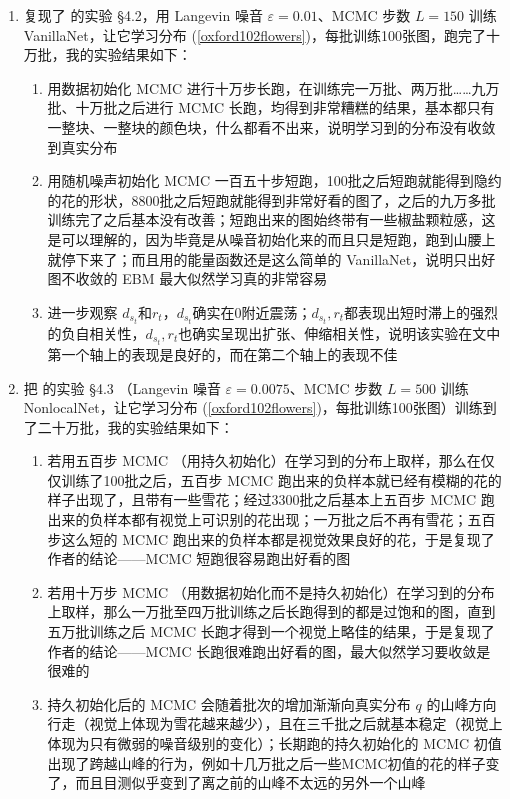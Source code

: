 \documentclass[11pt]{article}
\begin{document}
\begin{enumerate}
\begin{enumerate}
\end{enumerate}
\item 复现了 \cite{nijkamp2019anatomy} 的实验 \S4.2，用 Langevin 噪音 $\varepsilon=0.01$、MCMC 步数 $L=150$ 训练 VanillaNet，让它学习分布 (\ref{oxford102flowers})，每批训练100张图，跑完了十万批，我的实验结果如下：
\begin{enumerate}
\item 用数据初始化 MCMC 进行十万步长跑，在训练完一万批、两万批……九万批、十万批之后进行 MCMC 长跑，均得到非常糟糕的结果，基本都只有一整块、一整块的颜色块，什么都看不出来，说明学习到的分布没有收敛到真实分布
\item 用随机噪声初始化 MCMC 一百五十步短跑，100批之后短跑就能得到隐约的花的形状，8800批之后短跑就能得到非常好看的图了，之后的九万多批训练完了之后基本没有改善；短跑出来的图始终带有一些椒盐颗粒感，这是可以理解的，因为毕竟是从噪音初始化来的而且只是短跑，跑到山腰上就停下来了；而且用的能量函数还是这么简单的 VanillaNet，说明只出好图不收敛的 EBM 最大似然学习真的非常容易
\item 进一步观察 $d_{s_t}$和$r_t$，$d_{s_t}$确实在0附近震荡；$d_{s_t},r_t$都表现出短时滞上的强烈的负自相关性，$d_{s_t},r_t$也确实呈现出扩张、伸缩相关性，说明该实验在文中第一个轴上的表现是良好的，而在第二个轴上的表现不佳 
\end{enumerate}
\item 把 \cite{nijkamp2019anatomy} 的实验 \S4.3 （Langevin 噪音 $\varepsilon=0.0075$、MCMC 步数 $L=500$ 训练 NonlocalNet，让它学习分布 (\ref{oxford102flowers})，每批训练100张图）训练到了二十万批，我的实验结果如下：
\begin{enumerate}
\item 若用五百步 MCMC （用持久初始化）在学习到的分布上取样，那么在仅仅训练了100批之后，五百步 MCMC 跑出来的负样本就已经有模糊的花的样子出现了，且带有一些雪花；经过3300批之后基本上五百步 MCMC 跑出来的负样本都有视觉上可识别的花出现；一万批之后不再有雪花；五百步这么短的 MCMC 跑出来的负样本都是视觉效果良好的花，于是复现了作者的结论——MCMC 短跑很容易跑出好看的图
\item 若用十万步 MCMC （用数据初始化而不是持久初始化）在学习到的分布上取样，那么一万批至四万批训练之后长跑得到的都是过饱和的图，直到五万批训练之后 MCMC 长跑才得到一个视觉上略佳的结果，于是复现了作者的结论——MCMC 长跑很难跑出好看的图，最大似然学习要收敛是很难的
\item 持久初始化后的 MCMC 会随着批次的增加渐渐向真实分布 $q$ 的山峰方向行走（视觉上体现为雪花越来越少），且在三千批之后就基本稳定（视觉上体现为只有微弱的噪音级别的变化）；长期跑的持久初始化的 MCMC 初值出现了跨越山峰的行为，例如十几万批之后一些MCMC初值的花的样子变了，而且目测似乎变到了离之前的山峰不太远的另外一个山峰

\end{enumerate}
\end{enumerate}
\end{document}
